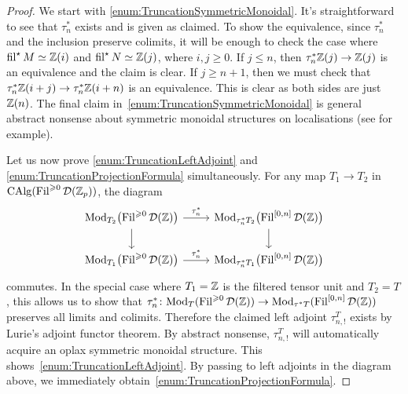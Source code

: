 \documentclass[DIV=12,numbers=enddot,leqno,bibliography=totoc]{scrartcl}
\begin{document}
	\begin{proof}
		We start with \cref{enum:TruncationSymmetricMonoidal}. It's straightforward to see that $\tau_n^*$ exists and is given as claimed. To show the equivalence, since $\tau_n^*$ and the inclusion preserve colimits, it will be enough to check the case where $\operatorname{fil}^\star M\simeq \mathbb{Z}(i)$ and $\operatorname{fil}^\star N\simeq \mathbb{Z}(j)$, where $i,j\geqslant 0$. If $j\leqslant n$, then $\tau_n^*\mathbb{Z}(j)\rightarrow \mathbb{Z}(j)$ is an equivalence and the claim is clear. If $j\geqslant n+1$, then we must check that $\tau_n^*\mathbb{Z}(i+j)\rightarrow \tau_n^*\mathbb{Z}(i+n)$ is an equivalence. This is clear as both sides are just $\mathbb{Z}(n)$. The final claim in~\cref{enum:TruncationSymmetricMonoidal} is general abstract nonsense about symmetric monoidal structures on localisations (see \cite[Proposition~]{HA} for example).
		
		Let us now prove \cref{enum:TruncationLeftAdjoint} and \cref{enum:TruncationProjectionFormula} simultaneously. For any map $T_1\rightarrow T_2$ in $\operatorname{CAlg}(\operatorname{Fil}^{\geqslant 0}\mathcal{D}(\mathbb{Z}_p))$, the diagram
		\begin{equation*}
			\begin{tikzcd}
				\Mod_{T_2}\bigl(\Fil^{\geqslant 0}\Dd(\IZ)\bigr)\rar["\tau_n^*"]\dar & \Mod_{\tau_n^*T_2}\bigl(\Fil^{[0,n]}\Dd(\IZ)\bigr)\dar\\
				\Mod_{T_1}\bigl(\Fil^{\geqslant 0}\Dd(\IZ)\bigr)\rar["\tau_n^*"] & \Mod_{\tau_n^*T_1}\bigl(\Fil^{[0,n]}\Dd(\IZ)\bigr)
			\end{tikzcd}
		\end{equation*}
		commutes. In the special case where $T_1=\mathbb{Z}$ is the filtered tensor unit and $T_2=T$, this allows us to show that $\tau_n^*\colon \Mod_T(\Fil^{\geqslant 0}\Dd(\IZ))\rightarrow \Mod_{\tau^*T}(\Fil^{[0,n]}\Dd(\IZ))$ preserves all limits and colimits. Therefore the claimed left adjoint $\tau_{n,!}^T$ exists by Lurie's adjoint functor theorem. By abstract nonsense, $\tau_{n,!}^T$ will automatically acquire an oplax symmetric monoidal structure. This shows~\cref{enum:TruncationLeftAdjoint}. By passing to left adjoints in the diagram above, we immediately obtain~\cref{enum:TruncationProjectionFormula}.
	\end{proof}
	
\end{document}
